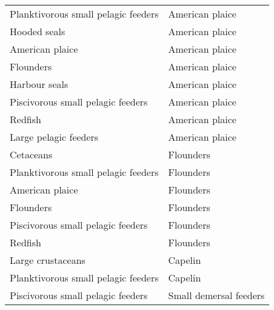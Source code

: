 \begin{table}[h!]
\begin{tabular}{|l|l|}
      Planktivorous small pelagic feeders & American plaice   \\
      Hooded seals                        & American plaice   \\
      American plaice                     & American plaice   \\
      Flounders                           & American plaice   \\
      Harbour seals                       & American plaice   \\
      Piscivorous small pelagic feeders   & American plaice   \\
      Redfish                             & American plaice   \\
      Large pelagic feeders               & American plaice   \\
      Cetaceans                           & Flounders \\
      Planktivorous small pelagic feeders & Flounders \\
      American plaice                     & Flounders \\
      Flounders                           & Flounders \\
      Piscivorous small pelagic feeders   & Flounders \\
      Redfish                             & Flounders \\
      Large crustaceans                   & Capelin   \\
      Planktivorous small pelagic feeders & Capelin   \\
      Piscivorous small pelagic feeders   & Small demersal feeders    \\
      \hline
  \end{tabular}
\end{table}
\newpage
